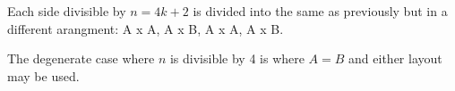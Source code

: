 \documentclass[11pt, a4paper]{article}
\begin{document}
Each side divisible by $n = 4k + 2$ is divided into the same as previously but in a different arangment: A x A, A x B, A x A, A x B.

The degenerate case where $n$ is divisible by 4 is where $A = B$ and either layout may be used.



\end{document}
